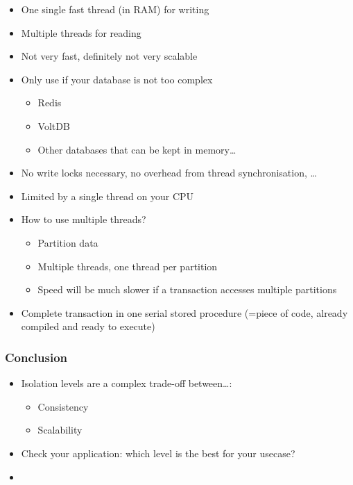 \documentclass{article}
\begin{document}
\begin{itemize}
    \item One single fast thread (in RAM) for writing
    \item Multiple threads for reading
    \item Not very fast, definitely not very scalable
    \item Only use if your database is not too complex
    \begin{itemize}
        \item Redis
        \item VoltDB
        \item Other databases that can be kept in memory\dots
    \end{itemize}
    \item No write locks necessary, no overhead from thread synchronisation, \dots
    \item Limited by a single thread on your CPU
    \item How to use multiple threads?
    \begin{itemize}
        \item Partition data
        \item Multiple threads, one thread per partition
        \item Speed will be much slower if a transaction accesses multiple partitions
    \end{itemize}
    \item Complete transaction in one serial stored procedure (=piece of code, already compiled and ready to execute)
\end{itemize}

\subsubsection{Conclusion}

\begin{itemize}
    \item Isolation levels are a complex trade-off between\dots:
    \begin{itemize}
        \item Consistency
        \item Scalability
    \end{itemize}
    \item Check your application: which level is the best for your usecase?
    \item 
\end{itemize}
\end{document}
